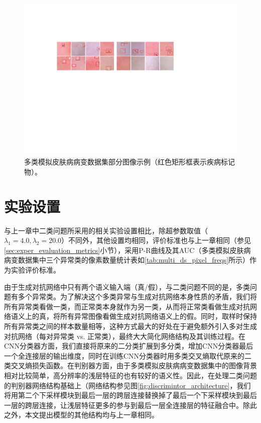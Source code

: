 \begin{figure}[h]
	\centering
	\includegraphics[width=1.0\textwidth]{figure/multi_classes_simulated_skin.pdf}
	\caption[多类模拟皮肤病病变数据集部分图像示例]{多类模拟皮肤病病变数据集部分图像示例（红色矩形框表示疾病标记物）。}
	\label{fig:mul_classes_simulated_ds}
\end{figure}

\section{实验设置}\label{sec:multi_classes_experiment_setting}
与上一章中二类问题所采用的相关实验设置相比，除超参数取值（$\lambda_{1}=4.0,\lambda_{2}=20.0$）不同外，其他设置均相同，评价标准也与上一章相同（参见\ref{sec:exper_evaluation_metrics}小节），采用P-R曲线及其AUC（多类模拟皮肤病病变数据集中三个异常类的像素数量统计表如\ref{tab:multi_ds_pixel_freqs}所示）作为实验评价标准。

由于生成对抗网络中只有两个语义输入端（真/假），与二类问题不同的是，多类问题有多个异常类。为了解决这个多类异常与生成对抗网络本身性质的矛盾，我们将所有异常类看做一类，而正常类本身就作为另一类，从而将正常类看做生成对抗网络语义上的真，将所有异常图像看做生成对抗网络语义上的假。同时，取样时保持所有异常类之间的样本数量相等，这种方式最大的好处在于避免额外引入多对生成对抗网络（每对异常类 vs. 正常类），最终大大简化网络结构及其训练过程。在CNN分类器方面，我们直接将原来的二分类扩展到多分类，增加CNN分类器最后一个全连接层的输出维度，同时在训练CNN分类器时用多类交叉熵取代原来的二类交叉熵损失函数。在判别器方面，由于多类模拟皮肤病病变数据集中的图像背景相对比较简单，高分辨率的浅层特征的也有较好的语义性。因此，在处理二类问题的判别器网络结构基础上（网络结构参见图\ref{fig:discrimintor_architecture}，我们将用第二个下采样模块到最后一层的跨层连接替换掉了最后一个下采样模块到最后一层的跨层连接，让浅层特征更多的参与到最后一层全连接层的特征融合中。除此之外，本文提出模型的其他结构均与上一章相同。

